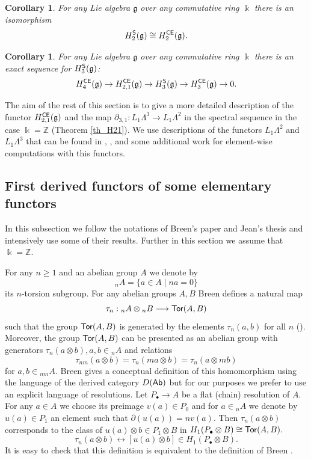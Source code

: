 \documentclass{amsart}
\numberwithin{equation}{section}
\newtheorem{corollary}[theorem]{Corollary}
\theoremstyle{definition}
\def\gg{\mathfrak{g}}
\def\kk{\Bbbk}
\def\ZZ{\mathbb{Z}}
\begin{document}
\begin{corollary}\label{cor_H_2S}
For any Lie algebra $\gg$ over any commutative ring $\kk$ there is an isomorphism 
$$H_2^{\sf S}(\gg)\cong H_2^{\sf CE}(\gg).$$
\end{corollary} 

\begin{corollary}\label{cor_H_3S}
For any Lie algebra $\gg$ over any commutative ring $\kk$ there is an exact sequence for $H_3^{\sf S}(\gg)$:
$$ H_4^{\sf CE}(\gg) \to  H_{2,1}^{\sf CE}(\gg) \to H_3^{\sf S}(\gg)\to H_3^{\sf CE}(\gg) \to 0. $$
\end{corollary}

The aim of the rest of this section is to give a more detailed description of the functor $H_{2,1}^{\sf CE}(\gg)$ and the map $\partial_{3,1} : L_1\Lambda^3 \to L_1 \Lambda^2$ in the spectral sequence in the case $\kk=\ZZ$ (Theorem \ref{th_H21}). We use descriptions of the functors $L_1\Lambda^2$ and $L_1 \Lambda^3$ that can be found in \cite{breen1999functorial}, \cite{breen2011derived}, \cite{jeanphdthesis} and some additional work for element-wise computations with this functors.

\subsection{First derived functors of some elementary functors}
 
In this subsection we follow the notations of Breen's paper \cite{breen1999functorial} and Jean's thesis \cite{jeanphdthesis} and intensively use some of their results. Further in this section we assume that $\kk=\ZZ.$ 

For any $n\geq 1$ and an abelian group $A$ we denote by  $${}_nA=\{a\in A\mid na=0\}$$
its $n$-torsion subgroup. For any abelian groups $A,B$ Breen defines a natural map 
$$\tau_n:{}_nA\otimes {}_nB \longrightarrow {\sf Tor}(A,B)$$
such that the group ${\sf Tor}(A,B)$ is generated by the elements $\tau_n(a,b)$ for all $n$ (\cite[Prop. 3.5]{breen1999functorial}). Moreover, the group ${\sf Tor}(A,B)$
can be presented as an abelian group with generators $\tau_n(a\otimes b), a,b\in {}_nA$ and relations 
$$\tau_{nm}(a\otimes b)=\tau_n(ma\otimes b)=\tau_n(a\otimes m b)$$
for $a,b\in {}_{nm}A.$
Breen  gives a conceptual definition of this homomorphism using the language of the derived category $D({\sf Ab})$ but for our purposes we prefer to use an  explicit language of resolutions.  
Let $P_\bullet \to A$ be a flat (chain) resolution of $A.$ For any $a\in A$ we choose  its preimage $v(a)\in P_0$ and for $a\in {}_nA$  we denote by  $u(a)\in P_1$ an element such that $\partial(u(a))=nv(a).$ Then  $\tau_n(a\otimes b)$ corresponds to the class of $u(a)\otimes b\in P_1\otimes B$ in $H_1(P_\bullet \otimes B)\cong {\sf Tor}(A,B).$
\begin{equation}
\tau_n(a\otimes b) \leftrightarrow [u(a)\otimes b] \in H_1( P_\bullet \otimes B).    
\end{equation}
It is easy to check that this definition is equivalent to the definition of Breen \cite[(3.6)]{breen1999functorial}.
\end{document}
